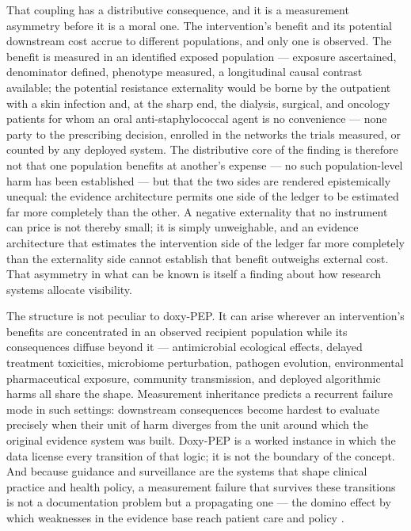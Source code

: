 \documentclass[10pt,letterpaper]{article}
\begin{document}
That coupling has a distributive consequence, and it is a
measurement asymmetry before it is a moral one. The
intervention's benefit and its potential downstream cost accrue to different populations, and only one is observed. The benefit is measured
in an identified exposed population --- exposure ascertained,
denominator defined, phenotype measured, a longitudinal causal contrast
available; the potential resistance externality would be borne by the
outpatient with a skin infection and, at the sharp end, the dialysis,
surgical, and oncology patients for whom an oral anti-staphylococcal
agent is no convenience --- none party to the prescribing decision,
enrolled in the networks the trials measured, or counted by any deployed
system. The distributive core of the finding is therefore not that one
population benefits at another's expense --- no such population-level
harm has been established --- but that the two sides are rendered
epistemically unequal: the evidence architecture permits one side of the
ledger to be estimated far more completely than the other. A negative
externality that no instrument can price is not thereby small; it is
simply unweighable, and an evidence architecture that estimates the intervention side of the ledger far more completely than the externality side cannot establish that benefit outweighs external cost. That asymmetry in
what can be known is itself a finding about how research systems
allocate visibility.

The structure is not peculiar to doxy-PEP. It can arise wherever an
intervention's benefits are concentrated in an observed recipient
population while its consequences diffuse beyond it --- antimicrobial
ecological effects, delayed treatment toxicities, microbiome
perturbation, pathogen evolution, environmental pharmaceutical exposure,
community transmission, and deployed algorithmic harms all share the
shape. Measurement inheritance predicts a recurrent failure mode in such
settings: downstream consequences become hardest to evaluate precisely
when their unit of harm diverges from the unit around which the original
evidence system was built. Doxy-PEP is a worked instance in which the
data license every transition of that logic; it is not the boundary of the concept. And because guidance and surveillance are the systems that shape clinical practice and health policy, a measurement failure that survives these transitions is not a documentation problem but a propagating one --- the domino effect by which weaknesses in the evidence base reach patient care and policy \cite{armond2024integrity}.
\end{document}
